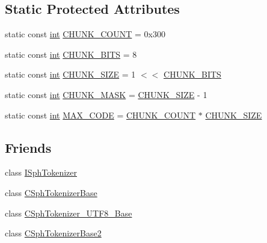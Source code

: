 \subsection*{Static Protected Attributes}
\begin{DoxyCompactItemize}
\item 
static const \hyperlink{sphinxexpr_8cpp_a4a26e8f9cb8b736e0c4cbf4d16de985e}{int} \hyperlink{classCSphLowercaser_add46c69c33b10aa129e666946b329cb7}{C\-H\-U\-N\-K\-\_\-\-C\-O\-U\-N\-T} = 0x300
\item 
static const \hyperlink{sphinxexpr_8cpp_a4a26e8f9cb8b736e0c4cbf4d16de985e}{int} \hyperlink{classCSphLowercaser_aaa2c3f2701c7b2aaddc3235a63e1895e}{C\-H\-U\-N\-K\-\_\-\-B\-I\-T\-S} = 8
\item 
static const \hyperlink{sphinxexpr_8cpp_a4a26e8f9cb8b736e0c4cbf4d16de985e}{int} \hyperlink{classCSphLowercaser_ae1d932fca473265a6dc9d48836cdb4ec}{C\-H\-U\-N\-K\-\_\-\-S\-I\-Z\-E} = 1 $<$$<$ \hyperlink{classCSphLowercaser_aaa2c3f2701c7b2aaddc3235a63e1895e}{C\-H\-U\-N\-K\-\_\-\-B\-I\-T\-S}
\item 
static const \hyperlink{sphinxexpr_8cpp_a4a26e8f9cb8b736e0c4cbf4d16de985e}{int} \hyperlink{classCSphLowercaser_a48f851f5191a4bd4e6f9bba6bd1d90f7}{C\-H\-U\-N\-K\-\_\-\-M\-A\-S\-K} = \hyperlink{classCSphLowercaser_ae1d932fca473265a6dc9d48836cdb4ec}{C\-H\-U\-N\-K\-\_\-\-S\-I\-Z\-E} -\/ 1
\item 
static const \hyperlink{sphinxexpr_8cpp_a4a26e8f9cb8b736e0c4cbf4d16de985e}{int} \hyperlink{classCSphLowercaser_ae93306949e3408ffa9f31be79c42f1be}{M\-A\-X\-\_\-\-C\-O\-D\-E} = \hyperlink{classCSphLowercaser_add46c69c33b10aa129e666946b329cb7}{C\-H\-U\-N\-K\-\_\-\-C\-O\-U\-N\-T} $\ast$ \hyperlink{classCSphLowercaser_ae1d932fca473265a6dc9d48836cdb4ec}{C\-H\-U\-N\-K\-\_\-\-S\-I\-Z\-E}
\end{DoxyCompactItemize}
\subsection*{Friends}
\begin{DoxyCompactItemize}
\item 
class \hyperlink{classCSphLowercaser_a9b192dca98863220d642b0348a68dbbe}{I\-Sph\-Tokenizer}
\item 
class \hyperlink{classCSphLowercaser_ab25cd87ad27c96e57f4c9bf16e624e5a}{C\-Sph\-Tokenizer\-Base}
\item 
class \hyperlink{classCSphLowercaser_a0c0953143f8285f6ad7c38dcd39c67db}{C\-Sph\-Tokenizer\-\_\-\-U\-T\-F8\-\_\-\-Base}
\item 
class \hyperlink{classCSphLowercaser_a31be57a45852be61715d8373da104250}{C\-Sph\-Tokenizer\-Base2}
\end{DoxyCompactItemize}


